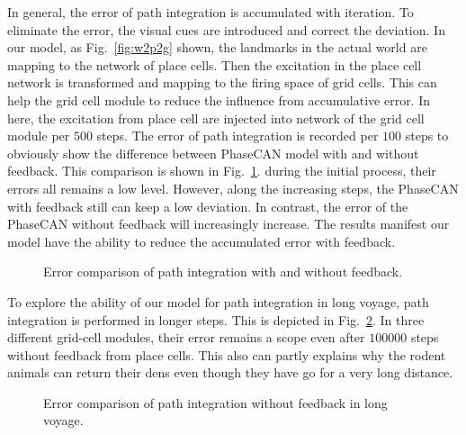 \documentclass[final,5p,times,twocolumn,authoryear]{elsarticle}
\begin{document}
In general, the error of path integration is accumulated with iteration. To eliminate the error, the visual cues are introduced and correct the deviation. In our model, as Fig.~\ref{fig:w2p2g} shown, the landmarks in the actual world are mapping to the network of place cells. Then the excitation in the place cell network is transformed and mapping to the firing space of grid cells. This can help the grid cell module to reduce the influence from accumulative error. In here, the excitation from place cell are injected into network of the grid cell module per $500$ steps. The error of path integration is recorded per $100$ steps to obviously show the difference between PhaseCAN model with and without feedback. This comparison is shown in Fig.~\ref{fig:path_integration_feedback}. during the initial process, their errors all remains a low level. However, along the increasing steps, the PhaseCAN with feedback still can keep a low deviation. In contrast, the error of the PhaseCAN without feedback will increasingly increase.  The results manifest our model have the ability to reduce the accumulated error with feedback.

\begin{figure}[!t]
	\centering
	\caption{Error comparison of path integration with and without feedback.  }
	\label{fig:path_integration_feedback}
\end{figure}

To explore the ability of our model for path integration in long voyage, path integration is performed in longer steps. This is depicted in Fig.~\ref{fig:path_integration_long}. In three different grid-cell modules, their error remains a scope even after $100000$ steps without feedback from place cells. This also can partly explains why the rodent animals can return their dens even though they have go for a very long distance. 
\begin{figure}[t]
	\centering
	\caption{Error comparison of path integration without feedback in long voyage. }
	\label{fig:path_integration_long}
\end{figure}
\end{document}

